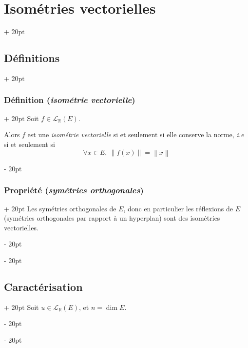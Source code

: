 \documentclass[a4paper, 12pt, twoside]{article}
\newcommand{\R}{\mathbb{R}} %
\newcommand{\norm}[1]{\left\lVert #1 \right\rVert}
\newcommand{\ind}[1][20pt]{\advance\leftskip + #1}
\newcommand{\deind}[1][20pt]{\advance\leftskip - #1}
\newenvironment{indt}[2][20pt]{#2 \par \ind[#1]}{\par \deind} %
\begin{document}
    \begin{indt}{\section{Isométries vectorielles}}
        \begin{indt}{\subsection{Définitions}}
            \begin{indt}{\subsubsection{Définition (\textit{isométrie vectorielle})}}
                Soit $f \in \mathcal L_\R(E)$.

                Alors $f$ est une \emph{isométrie vectorielle} si et seulement si elle conserve la norme, \textit{i.e} si et seulement si
                \[
                    \forall x \in E,\
                    \norm{f(x)} = \norm x
                \]
            \end{indt}

            \vspace{12pt}
            
            \begin{indt}{\subsubsection{Propriété (\textit{symétries orthogonales})}}
                Les symétries orthogonales de $E$, donc en particulier les réflexions de $E$ (symétries orthogonales par rapport à un hyperplan) sont des isométries vectorielles.
            \end{indt}
        \end{indt}

        \vspace{12pt}
        
        \begin{indt}{\subsection{Caractérisation}}
            Soit $u \in \mathcal L_\R(E)$, et $n = \dim E$.


\end{indt}
\end{indt}
\end{document}
